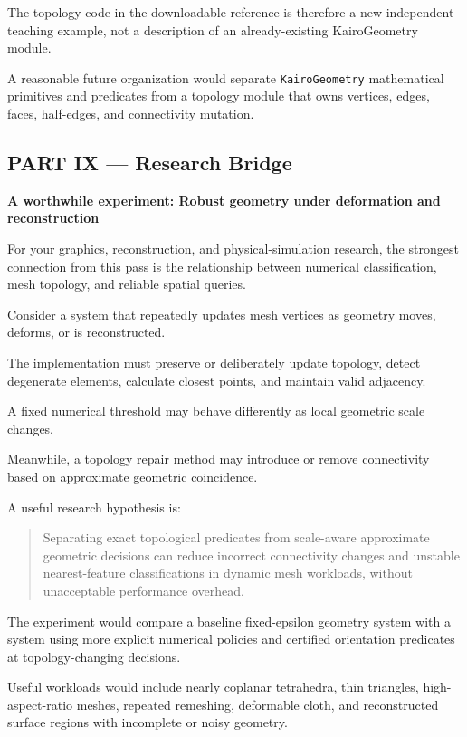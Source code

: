 The topology code in the downloadable reference is therefore a new independent teaching example, not a description of an already-existing KairoGeometry module.

A reasonable future organization would separate \texttt{KairoGeometry} mathematical primitives and predicates from a topology module that owns vertices, edges, faces, half-edges, and connectivity mutation.

\subsection{PART IX --- Research Bridge}\label{04-visual-computing-ii-ch023-part-ix-research-bridge}

\hypertarget{04-visual-computing-ii-ch023-part-ix-research-bridge}{}

\textbf{A worthwhile experiment: Robust geometry under deformation and reconstruction}

For your graphics, reconstruction, and physical-simulation research, the strongest connection from this pass is the relationship between numerical classification, mesh topology, and reliable spatial queries.

Consider a system that repeatedly updates mesh vertices as geometry moves, deforms, or is reconstructed.

The implementation must preserve or deliberately update topology, detect degenerate elements, calculate closest points, and maintain valid adjacency.

A fixed numerical threshold may behave differently as local geometric scale changes.

Meanwhile, a topology repair method may introduce or remove connectivity based on approximate geometric coincidence.

A useful research hypothesis is:

\begin{quote}
Separating exact topological predicates from scale-aware approximate geometric decisions can reduce incorrect connectivity changes and unstable nearest-feature classifications in dynamic mesh workloads, without unacceptable performance overhead.
\end{quote}

The experiment would compare a baseline fixed-epsilon geometry system with a system using more explicit numerical policies and certified orientation predicates at topology-changing decisions.

Useful workloads would include nearly coplanar tetrahedra, thin triangles, high-aspect-ratio meshes, repeated remeshing, deformable cloth, and reconstructed surface regions with incomplete or noisy geometry.


